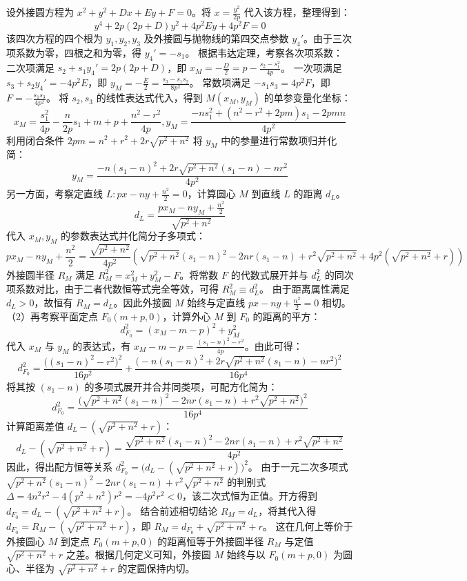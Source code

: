 \begin{solution}
设外接圆方程为 $x^2 + y^2 + Dx + Ey + F = 0$。将 $x = \frac{y^2}{2p}$ 代入该方程，整理得到：
$$ y^4 + 2p(2p+D)y^2 + 4p^2 Ey + 4p^2 F = 0 $$
该四次方程的四个根为 $y_1, y_2, y_3$ 及外接圆与抛物线的第四交点参数 $y_4'$。由于三次项系数为零，四根之和为零，得 $y_4' = -s_1$。
根据韦达定理，考察各次项系数：
二次项满足 $s_2 + s_1 y_4' = 2p(2p+D)$，即 $x_M = -\frac{D}{2} = p - \frac{s_2 - s_1^2}{4p}$。
一次项满足 $s_3 + s_2 y_4' = -4p^2 E$，即 $y_M = -\frac{E}{2} = \frac{s_3 - s_1 s_2}{8p^2}$。
常数项满足 $-s_1 s_3 = 4p^2 F$，即 $F = -\frac{s_1 s_3}{4p^2}$。
将 $s_2, s_3$ 的线性表达式代入，得到 $M(x_M, y_M)$ 的单参变量化坐标：
$$ x_M = \frac{s_1^2}{4p} - \frac{n}{2p} s_1 + m + p + \frac{n^2 - r^2}{4p} ,y_M = \frac{-n s_1^2 + (n^2 - r^2 + 2pm) s_1 - 2pmn}{4p^2} $$
利用闭合条件 $2pm = n^2 + r^2 + 2r\sqrt{p^2+n^2}$ 将 $y_M$ 中的参量进行常数项归并化简：
$$ y_M = \frac{-n(s_1-n)^2 + 2r\sqrt{p^2+n^2}(s_1-n) - nr^2}{4p^2} $$
另一方面，考察定直线 $L: px - ny + \frac{n^2}{2} = 0$，计算圆心 $M$ 到直线 $L$ 的距离 $d_L$。
$$ d_L = \frac{px_M - ny_M + \frac{n^2}{2}}{\sqrt{p^2+n^2}} $$
代入 $x_M, y_M$ 的参数表达式并化简分子多项式：
$$ p x_M - n y_M + \frac{n^2}{2} = \frac{\sqrt{p^2+n^2}}{4p^2} \left( \sqrt{p^2+n^2}(s_1-n)^2 - 2nr(s_1-n) + r^2\sqrt{p^2+n^2} + 4p^2(\sqrt{p^2+n^2}+r) \right) $$
外接圆半径 $R_M$ 满足 $R_M^2 = x_M^2 + y_M^2 - F$。将常数 $F$ 的代数式展开并与 $d_L^2$ 的同次项系数对比，由于二者代数恒等式完全等效，可得 $R_M^2 \equiv d_L^2$。
由于距离属性满足 $d_L > 0$，故恒有 $R_M = d_L$。因此外接圆 $M$ 始终与定直线 $px - ny + \frac{n^2}{2} = 0$ 相切。\\
（2）再考察平面定点 $F_0(m+p, 0)$，计算外心 $M$ 到 $F_0$ 的距离的平方：
$$ d_{F_0}^2 = (x_M - m - p)^2 + y_M^2 $$
代入 $x_M$ 与 $y_M$ 的表达式，有 $x_M - m - p = \frac{(s_1-n)^2 - r^2}{4p}$。由此可得：
$$ d_{F_0}^2 = \frac{\big((s_1-n)^2 - r^2\big)^2}{16p^2} + \frac{\big(-n(s_1-n)^2 + 2r\sqrt{p^2+n^2}(s_1-n) - nr^2\big)^2}{16p^4} $$
将其按 $(s_1-n)$ 的多项式展开并合并同类项，可配方化简为：
$$ d_{F_0}^2 = \frac{\big(\sqrt{p^2+n^2}(s_1-n)^2 - 2nr(s_1-n) + r^2\sqrt{p^2+n^2}\big)^2}{16p^4} $$
计算距离差值 $d_L - (\sqrt{p^2+n^2} + r)$：
$$ d_L - (\sqrt{p^2+n^2} + r) = \frac{\sqrt{p^2+n^2}(s_1-n)^2 - 2nr(s_1-n) + r^2\sqrt{p^2+n^2}}{4p^2} $$
因此，得出配方恒等关系 $d_{F_0}^2 = \big(d_L - (\sqrt{p^2+n^2} + r)\big)^2$。
由于一元二次多项式 $\sqrt{p^2+n^2}(s_1-n)^2 - 2nr(s_1-n) + r^2\sqrt{p^2+n^2}$ 的判别式 $\Delta = 4n^2 r^2 - 4(p^2+n^2)r^2 = -4p^2 r^2 < 0$，该二次式恒为正值。开方得到 $d_{F_0} = d_L - (\sqrt{p^2+n^2} + r)$。
结合前述相切结论 $R_M = d_L$，将其代入得 $d_{F_0} = R_M - (\sqrt{p^2+n^2} + r)$，即 $R_M = d_{F_0} + \sqrt{p^2+n^2} + r$。
这在几何上等价于外接圆心 $M$ 到定点 $F_0(m+p, 0)$ 的距离恒等于外接圆半径 $R_M$ 与定值 $\sqrt{p^2+n^2} + r$ 之差。根据几何定义可知，外接圆 $M$ 始终与以 $F_0(m+p, 0)$ 为圆心、半径为 $\sqrt{p^2+n^2} + r$ 的定圆保持内切。
\end{solution}

